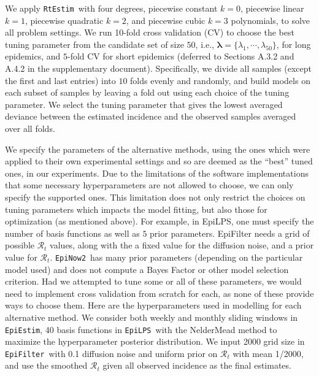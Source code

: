 \documentclass[10pt,letterpaper]{article}
\def\RtEstim{\texttt{RtEstim}}
\def\EpiEstim{\texttt{EpiEstim}}
\def\EpiLPS{\texttt{EpiLPS}}
\def\EpiFilter{\texttt{EpiFilter}}
\def\EpiNow2{\texttt{EpiNow2}}
\def\calR{\mathcal{R}}
\begin{document}
We apply \RtEstim\ with four degrees, piecewise constant $k=0$, piecewise linear $k=1$, 
piecewise quadratic $k=2$, and piecewise cubic $k=3$ polynomials, to solve all problem settings.
We run 10-fold cross validation (CV) to choose the best tuning parameter
from the candidate set of size $50$, i.e., $\boldsymbol{\lambda} = \{\lambda_1,
\cdots, \lambda_{50}\}$, for long epidemics, and $5$-fold CV for short epidemics 
(deferred to Sections A.3.2 and A.4.2 in the supplementary document). 
Specifically, we divide all samples (except the first and last entries) into
$10$ folds evenly and randomly, and build models on each subset of samples 
by leaving a fold out using each choice of the tuning parameter. We select the 
tuning parameter that gives the lowest averaged deviance between the 
estimated incidence and the observed samples averaged over all folds. 

We specify the parameters of the alternative methods, using the ones which were 
applied to their own experimental settings and so are deemed as the ``best'' tuned 
ones, in our experiments. Due to the limitations of the software implementations that
some necessary hyperparameters are not allowed to choose, we can only specify 
the supported ones. 
This limitation does not only restrict the choices on tuning parameters which impacts 
the model fitting, but also those for optimization (as mentioned above). 
For example, in EpiLPS, one must specify the number of basis functions as well as 
$5$ prior parameters. EpiFilter needs a grid of possible $\calR_t$ values, 
along with the a fixed value for the diffusion noise, and a prior value for 
$\calR_t$. \EpiNow2\ has many prior parameters (depending on the particular model 
used) and does not compute a Bayes Factor or other model selection criterion. 
Had we attempted to tune some or all of these parameters, we would need to 
implement cross validation from scratch for each, as none of these provide 
ways to choose them. 
Here are the hyperparameters used in modelling for each alternative method. 
We consider both weekly and monthly sliding windows in \EpiEstim, 
40 basis functions in \EpiLPS\ with the NelderMead method to maximize the 
hyperparameter posterior distribution. We input 2000 grid size in \EpiFilter\ 
with 0.1 diffusion noise and uniform prior on $\calR_t$ with mean 
1/2000, and use the smoothed $\calR_t$ given all observed incidence as the final 
estimates. 
\end{document}
